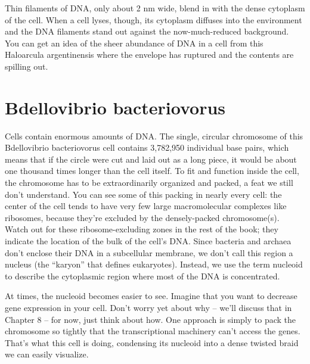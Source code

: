 \documentclass[]{tufte-book}
\begin{document}
Thin filaments of DNA, only about 2 nm wide, blend in with the dense cytoplasm of the cell. When a cell lyses, though, its cytoplasm diffuses into the environment and the DNA filaments stand out against the now-much-reduced background. You can get an idea of the sheer abundance of DNA in a cell from this Haloarcula argentinensis where the envelope has ruptured and the contents are spilling out.

\hypertarget{htmlwidget-19cd9b39b9059ef0add6}{}

\hypertarget{bdellovibrio-bacteriovorus}{%
\section{Bdellovibrio bacteriovorus}\label{bdellovibrio-bacteriovorus}}

Cells contain enormous amounts of DNA. The single, circular chromosome of this Bdellovibrio bacteriovorus cell contains 3,782,950 individual base pairs, which means that if the circle were cut and laid out as a long piece, it would be about one thousand times longer than the cell itself. To fit and function inside the cell, the chromosome has to be extraordinarily organized and packed, a feat we still don't understand. You can see some of this packing in nearly every cell: the center of the cell tends to have very few large macromolecular complexes like ribosomes, because they're excluded by the densely-packed chromosome(s). Watch out for these ribosome-excluding zones in the rest of the book; they indicate the location of the bulk of the cell's DNA. Since bacteria and archaea don't enclose their DNA in a subcellular membrane, we don't call this region a nucleus (the ``karyon'' that defines eukaryotes). Instead, we use the term nucleoid to describe the cytoplasmic region where most of the DNA is concentrated.

At times, the nucleoid becomes easier to see. Imagine that you want to decrease gene expression in your cell. Don't worry yet about why -- we'll discuss that in Chapter 8 -- for now, just think about how. One approach is simply to pack the chromosome so tightly that the transcriptional machinery can't access the genes. That's what this cell is doing, condensing its nucleoid into a dense twisted braid we can easily visualize.

\hypertarget{htmlwidget-c28b2b2a0aee766d52e9}{}


\end{document}
